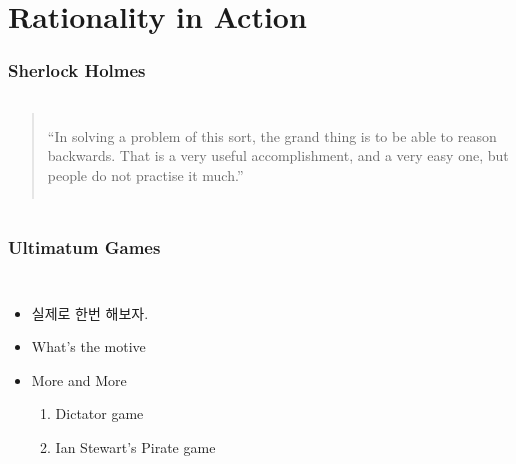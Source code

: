 \documentclass[final]{beamer}
\begin{document}
\section{Rationality in Action}
%
\begin{frame}\frametitle{Sherlock Holmes}\vspace{3.5em}
%
\begin{columns}[c]
\column{14em}
\hspace{2em}
\column{16em}
\begin{quote}
``In solving a problem of this sort, the grand thing is to be able to reason backwards. That is a very useful accomplishment, and a very easy one, but people do not practise it much.''
\end{quote}
\end{columns}
\end{frame}
%
\begin{frame}\frametitle{Ultimatum Games}\vspace{3.5em}
%
\begin{columns}[c]
\column{16em}
\begin{itemize}
\item 실제로 한번 해보자. 
\item What's the motive
\item More and More
\begin{enumerate}
	\item Dictator game 
	\item Ian Stewart's Pirate game 
\end{enumerate}
\end{itemize}
\column{14em}
\hspace{-2em}
\end{columns}
\end{frame}
%
\end{document}

